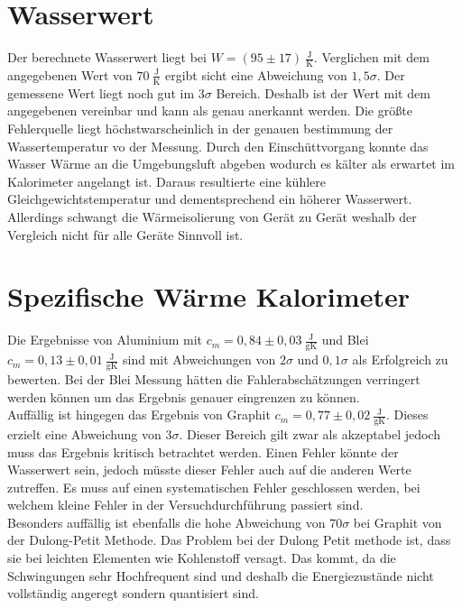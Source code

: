 
\section{Wasserwert}

Der berechnete Wasserwert liegt bei $\boxed{W= ( 95 \pm  17)\ \tfrac{\text{J}}{\text{K}}}$.
Verglichen mit dem angegebenen Wert von $70\ \tfrac{\text{J}}{\text{K}}$ ergibt sicht eine Abweichung
von $1,5 \sigma$. Der gemessene Wert liegt noch gut im $3\sigma$ Bereich. Deshalb ist der Wert mit
dem angegebenen vereinbar und kann als genau anerkannt werden.
Die größte Fehlerquelle liegt höchstwarscheinlich in der genauen bestimmung der Wassertemperatur vo der Messung.
Durch den Einschüttvorgang konnte das Wasser Wärme an die Umgebungsluft abgeben wodurch es kälter als erwartet im Kalorimeter angelangt ist.
Daraus resultierte eine kühlere Gleichgewichtstemperatur und dementsprechend ein höherer Wasserwert. Allerdings schwangt die Wärmeisolierung von Gerät zu Gerät weshalb der Vergleich nicht für alle Geräte Sinnvoll ist.

\section{Spezifische Wärme Kalorimeter}
Die Ergebnisse von Aluminium mit $\boxed{c_m = 0,84 \pm 0,03\ \tfrac{\text{J}}{\text{gK}}}$ und Blei $\boxed{c_m = 0,13\pm0,01\ \tfrac{\text{J}}{\text{gK}}}$
sind mit Abweichungen von $2\sigma$ und $0,1\sigma$ als Erfolgreich zu bewerten. Bei der Blei Messung
hätten die Fahlerabschätzungen verringert werden können um das Ergebnis genauer eingrenzen zu können.\\
Auffällig ist hingegen das Ergebnis von Graphit  $\boxed{c_m = 0,77\pm0,02\ \tfrac{\text{J}}{\text{gK}}}$. Dieses erzielt eine Abweichung von $3\sigma$.
Dieser Bereich gilt zwar als akzeptabel jedoch muss das Ergebnis kritisch betrachtet werden.
Einen Fehler könnte der Wasserwert sein, jedoch müsste dieser Fehler auch auf die anderen Werte zutreffen.
Es muss auf einen systematischen Fehler geschlossen werden, bei welchem kleine Fehler in der Versuchdurchführung passiert sind.\\
Besonders auffällig ist ebenfalls die hohe Abweichung von $70\sigma$ bei Graphit von der Dulong-Petit Methode.
Das Problem bei der Dulong Petit methode ist, dass sie bei leichten Elementen wie Kohlenstoff versagt. Das kommt, da die
Schwingungen sehr Hochfrequent sind und deshalb die Energiezustände nicht vollständig angeregt sondern quantisiert sind.


